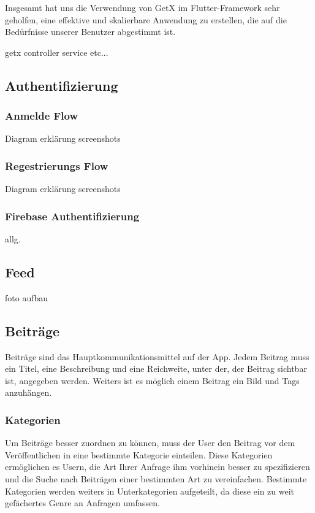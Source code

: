 Insgesamt hat uns die Verwendung von GetX im Flutter-Framework sehr geholfen, eine effektive und skalierbare Anwendung zu erstellen, die auf die Bedürfnisse unserer Benutzer abgestimmt ist.
\author{Sandin Habibovic}
getx controller service etc...


\subsection{Authentifizierung}
\author{Sandin Habibovic}

\subsubsection{Anmelde Flow}
\author{Sandin Habibovic}

Diagram
erklärung
screenshots
\subsubsection{Regestrierungs Flow}
\author{Sandin Habibovic}


Diagram
erklärung
screenshots


\subsubsection{Firebase Authentifizierung}
\author{Sandin Habibovic}

allg.


\subsection{Feed}
\author{Sandin Habibovic}
foto
aufbau

\subsection{Beiträge}
\author{Sandin Habibovic}
Beiträge sind das Hauptkommunikationsmittel auf der App. Jedem Beitrag muss ein Titel, eine Beschreibung und eine Reichweite, unter der, der Beitrag sichtbar ist, angegeben werden. Weiters ist es möglich einem Beitrag ein Bild und Tags anzuhängen.

\subsubsection{Kategorien}
\author{Sandin Habibovic}
Um Beiträge besser zuordnen zu können, muss der User den Beitrag vor dem Veröffentlichen in eine bestimmte Kategorie einteilen. Diese Kategorien ermöglichen es Usern, die Art Ihrer Anfrage ihm vorhinein besser zu spezifizieren und die Suche nach Beiträgen einer bestimmten Art zu vereinfachen. Bestimmte Kategorien werden weiters in Unterkategorien aufgeteilt, da diese ein zu weit gefächertes Genre an Anfragen umfassen.

